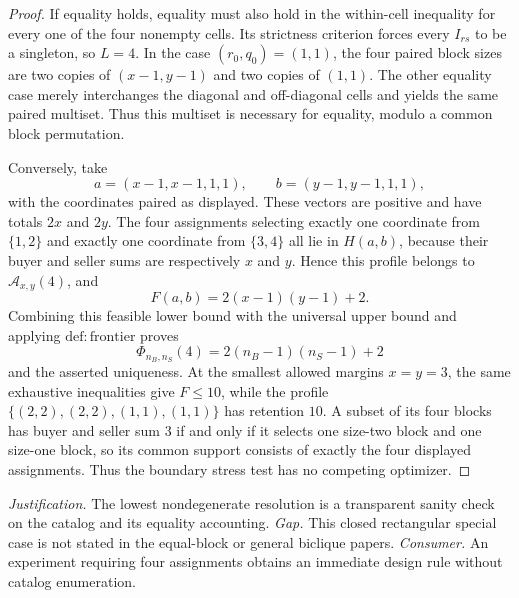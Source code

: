 \documentclass{article}
\begin{document}
\begin{proof}
If equality holds, equality must also hold in the within-cell inequality for every one of the four nonempty cells.  Its strictness criterion forces every \(I_{rs}\) to be a singleton, so \(L=4\).  In the case \((r_0,q_0)=(1,1)\), the four paired block sizes are two copies of \((x-1,y-1)\) and two copies of \((1,1)\).  The other equality case merely interchanges the diagonal and off-diagonal cells and yields the same paired multiset.  Thus this multiset is necessary for equality, modulo a common block permutation.

Conversely, take
\[
 a=(x-1,x-1,1,1),\qquad b=(y-1,y-1,1,1),
\]
with the coordinates paired as displayed.  These vectors are positive and have totals \(2x\) and \(2y\).  The four assignments selecting exactly one coordinate from \(\{1,2\}\) and exactly one coordinate from \(\{3,4\}\) all lie in \(H(a,b)\), because their buyer and seller sums are respectively \(x\) and \(y\).  Hence this profile belongs to \(\mathcal A_{x,y}(4)\), and
\[
 F(a,b)=2(x-1)(y-1)+2.
\]
Combining this feasible lower bound with the universal upper bound and applying \(\mathrm{def{:}frontier}\) proves
\[
 \Phi_{n_B,n_S}(4)=2(n_B-1)(n_S-1)+2
\]
and the asserted uniqueness.  At the smallest allowed margins \(x=y=3\), the same exhaustive inequalities give \(F\le10\), while the profile \(\{(2,2),(2,2),(1,1),(1,1)\}\) has retention \(10\).  A subset of its four blocks has buyer and seller sum \(3\) if and only if it selects one size-two block and one size-one block, so its common support consists of exactly the four displayed assignments.  Thus the boundary stress test has no competing optimizer.
\end{proof}
\par\smallskip\noindent \textit{Justification.} The lowest nondegenerate resolution is a transparent sanity check on the catalog and its equality accounting. \textit{Gap.} This closed rectangular special case is not stated in the equal-block or general biclique papers. \textit{Consumer.} An experiment requiring four assignments obtains an immediate design rule without catalog enumeration.
\end{document}
